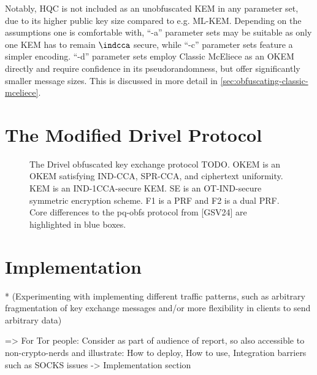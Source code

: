 Notably, HQC is not included as an unobfuscated KEM in any parameter set, due to its higher public key size compared to e.g. ML-KEM. Depending on the assumptions one is comfortable with, ``-a'' parameter sets may be suitable as only one KEM has to remain $\indcca$ secure, while ``-c'' parameter sets feature a simpler encoding. ``-d'' parameter sets employ Classic McEliece as an OKEM directly and require confidence in its pseudorandomness, but offer significantly smaller message sizes. This is discussed in more detail in \cref{sec:obfuscating-classic-mceliece}.

\section{The Modified Drivel Protocol} \label{sec:drivel}


\begin{figure}
    
    \caption[
        The modified drivel TODO.
    ]{
        The Drivel obfuscated key exchange protocol TODO.
        OKEM is an OKEM satisfying IND-CCA, SPR-CCA, and ciphertext uniformity.
        KEM is an IND-1CCA-secure KEM.
        SE is an OT-IND-secure symmetric encryption scheme.
        F1 is a PRF and F2 is a dual PRF.
        Core differences to the pq-obfs protocol from [GSV24] are highlighted in blue boxes.
    }
    \label{fig:modified-drivel}
\end{figure}

\section{Implementation} \label{sec:implementation}

* (Experimenting with implementing different traffic patterns, such as arbitrary fragmentation of key
exchange messages and/or more flexibility in clients to send arbitrary data)


=> For Tor people: Consider as part of audience of report, so also accessible to non-crypto-nerds and illustrate: How to deploy, How to use, Integration barriers such as SOCKS issues -> Implementation section
